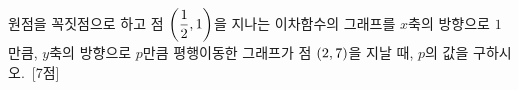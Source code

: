 원점을 꼭짓점으로 하고 점 $\left(\dfrac{1}{2}{,}\mkern3mu\mathopen{}1\right)$을 지나는 이차함수의 그래프를 $x$축의 방향으로 $1$만큼, $y$축의 방향으로 $p$만큼 평행이동한 그래프가 점 $(2{,}\mkern3mu\mathopen{}7)$을 지날 때, $p$의 값을 구하시오.~\mbox{\mbox{[7점]}}
